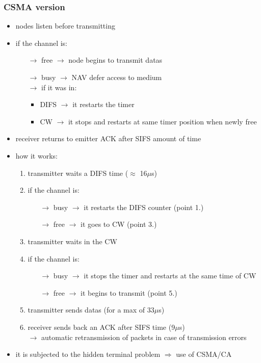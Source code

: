 \subsubsection{CSMA version}
\begin{itemize}
    \item nodes listen before transmitting
    \item if the channel is:
    \begin{itemize}
        \item[$\rightarrow$] free $\rightarrow$ node begins to transmit datas
        \item[$\rightarrow$] busy $\rightarrow$ NAV defer access to medium\\
        \hspace*{0.75cm}$\rightarrow$ if it was in:
        \begin{itemize}
            \item DIFS $\rightarrow$ it restarts the timer
            \item CW $\rightarrow$ it stops and restarts at same timer position when newly free
        \end{itemize}
    \end{itemize}
    \item receiver returns to emitter ACK after SIFS amount of time
    \item how it works:
    \begin{enumerate}
        \item transmitter waits a DIFS time ($\approx$ 16$\mu$s)
        \item if the channel is:
        \begin{itemize}
            \item[$\rightarrow$] busy $\rightarrow$ it restarts the DIFS counter (point 1.)
            \item[$\rightarrow$] free $\rightarrow$ it goes to CW (point 3.)
        \end{itemize}
        \item transmitter waits in the CW
        \item if the channel is:
        \begin{itemize}
            \item[$\rightarrow$] busy $\rightarrow$ it stops the timer and restarts at the same time of CW
            \item[$\rightarrow$] free $\rightarrow$ it begins to transmit (point 5.)
        \end{itemize}
        \item transmitter sends datas (for a max of 33$\mu$s)
        \item receiver sends back an ACK after SIFS time (9$\mu$s)\\
        $\rightarrow$ automatic retransmission of packets in case of transmission errors
    \end{enumerate}
    \item it is subjected to the hidden terminal problem $\Rightarrow$ use of CSMA/CA
\end{itemize}
